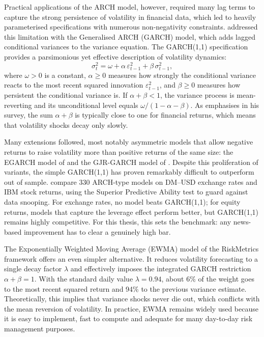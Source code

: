 Practical applications of the ARCH model, however, required many lag terms to capture the strong persistence of volatility in financial data, which led to heavily parameterised specifications with numerous non-negativity constraints. \textcite{bollerslev1986} addressed this limitation with the Generalised ARCH (GARCH) model, which adds lagged conditional variances to the variance equation. The GARCH(1,1) specification provides a parsimonious yet effective description of volatility dynamics:
\begin{equation}
  \sigma^2_t = \omega + \alpha\,\varepsilon^2_{t-1} + \beta\,\sigma^2_{t-1},
  \label{eq:garch}
\end{equation}
where $\omega > 0$ is a constant, $\alpha \geq 0$ measures how strongly the conditional variance reacts to the most recent squared innovation $\varepsilon^2_{t-1}$, and $\beta \geq 0$ measures how persistent the conditional variance is. If $\alpha + \beta < 1$, the variance process is mean-reverting and its unconditional level equals $\omega / (1 - \alpha - \beta)$. As \textcite{engle2001} emphasises in his survey, the sum $\alpha + \beta$ is typically close to one for financial returns, which means that volatility shocks decay only slowly.

Many extensions followed, most notably asymmetric models that allow negative returns to raise volatility more than positive returns of the same size: the EGARCH model of \textcite{nelson1991} and the GJR-GARCH model of \textcite{glosten1993}. Despite this proliferation of variants, the simple GARCH(1,1) has proven remarkably difficult to outperform out of sample. \textcite{hansen2005} compare 330 ARCH-type models on DM--USD exchange rates and IBM stock returns, using the Superior Predictive Ability test to guard against data snooping. For exchange rates, no model beats GARCH(1,1); for equity returns, models that capture the leverage effect perform better, but GARCH(1,1) remains highly competitive. For this thesis, this sets the benchmark: any news-based improvement has to clear a genuinely high bar.

The Exponentially Weighted Moving Average (EWMA) model of the RiskMetrics framework \parencite{riskmetrics1996} offers an even simpler alternative. It reduces volatility forecasting to a single decay factor $\lambda$ and effectively imposes the integrated GARCH restriction $\alpha + \beta = 1$. With the standard daily value $\lambda = 0.94$, about 6\% of the weight goes to the most recent squared return and 94\% to the previous variance estimate. Theoretically, this implies that variance shocks never die out, which conflicts with the mean reversion of volatility. In practice, EWMA remains widely used because it is easy to implement, fast to compute and adequate for many day-to-day risk management purposes.

